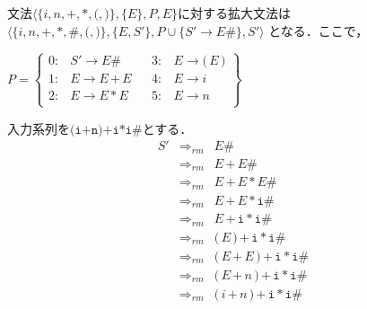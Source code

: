 \documentclass[a4j,dvipdfmx]{jbook}
\begin{document}
\begin{Exmp}
  文法$\langle\{i,n,\texttt{+},\texttt{*},\texttt{(},\texttt{)}\},\{E\},P,E\}$に対する拡大文法は
  $\langle\{i,n,\texttt{+},\texttt{*},\texttt{\#},\texttt{(},\texttt{)}\},\{E,S'\},P\cup\{S'\rightarrow E\texttt{\#}\},S'\rangle$
  となる．ここで，

  $P=\left\{\begin{array}{rlcrl}
      0: & S'\rightarrow E\texttt{\#}    &  & 3: & E\rightarrow \texttt{(}\,E\,\texttt{)} \\
      1: & E\rightarrow E\,\texttt{+}\,E &  & 4: & E\rightarrow i                         \\
      2: & E\rightarrow E\,\texttt{*}\,E &  & 5: & E\rightarrow n                         \\
    \end{array}\right\}$

  入力系列を$\texttt{(i+n)+i*i\#}$とする．
  \[\begin{array}{rcl}
      S' & \Rightarrow_{rm} & E\texttt{\#}                                                                                        \\
         & \Rightarrow_{rm} & E\,\texttt{+}\,E\texttt{\#}                                                                         \\
         & \Rightarrow_{rm} & E\,\texttt{+}\,E\,\texttt{*}\,E\texttt{\#}                                                          \\
         & \Rightarrow_{rm} & E\,\texttt{+}\,E\,\texttt{*}\,\texttt{i}\texttt{\#}                                                 \\
         & \Rightarrow_{rm} & E\,\texttt{+}\,\texttt{i}\,\texttt{*}\,\texttt{i}\texttt{\#}                                        \\
         & \Rightarrow_{rm} & \texttt{(}\,E\,\texttt{)}\,\texttt{+}\,\texttt{i}\,\texttt{*}\,\texttt{i}\texttt{\#}                \\
         & \Rightarrow_{rm} & \texttt{(}\,E\,\texttt{+}\,E\,\texttt{)}\,\texttt{+}\,\texttt{i}\,\texttt{*}\,\texttt{i}\texttt{\#} \\
         & \Rightarrow_{rm} & \texttt{(}\,E\,\texttt{+}\,n\,\texttt{)}\,\texttt{+}\,\texttt{i}\,\texttt{*}\,\texttt{i}\texttt{\#} \\
         & \Rightarrow_{rm} & \texttt{(}\,i\,\texttt{+}\,n\,\texttt{)}\,\texttt{+}\,\texttt{i}\,\texttt{*}\,\texttt{i}\texttt{\#} \\
    \end{array}\]


\end{Exmp}
\end{document}
